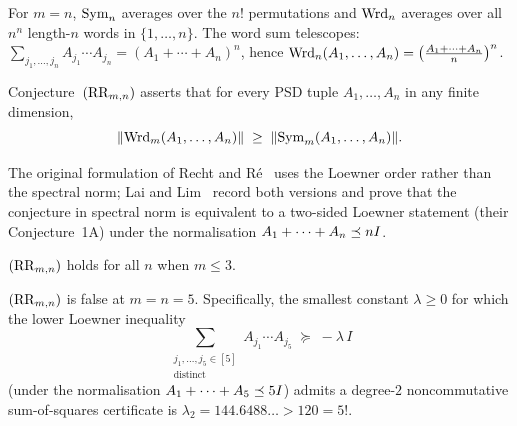\begin{remark}\label{rem:telescope}
For $m=n$, $\mathrm{Sym}_n$ averages over the $n!$ permutations and
$\mathrm{Wrd}_n$ averages over all $n^n$ length-$n$ words in
$\{1,\dots,n\}$.  The word sum telescopes:
$\sum_{j_1,\dots,j_n}A_{j_1}\cdots A_{j_n}=(A_1+\cdots+A_n)^{n}$,
hence $\mathrm{Wrd}_n(A_1,\dots,A_n)
= \bigl(\tfrac{A_1+\cdots+A_n}{n}\bigr)^{n}$.
\end{remark}

\begin{definition}
\label{def:rr}
Conjecture~$(\mathrm{RR}_{m,n})$ asserts that for every PSD tuple
$A_1,\dots,A_n$ in any finite dimension,
\[
  \lVert\mathrm{Wrd}_m(A_1,\dots,A_n)\rVert
  \;\ge\;
  \lVert\mathrm{Sym}_m(A_1,\dots,A_n)\rVert.
\]
\end{definition}

The original formulation of Recht and R\'e~\cite{RechtRe2012} uses the
Loewner order rather than the spectral norm; Lai and
Lim~\cite{LaiLim2020} record both versions and prove that the
conjecture in spectral norm is equivalent to a two-sided Loewner
statement (their Conjecture~1A) under the normalisation
$A_1+\cdots+A_n\preceq nI$.

\begin{theorem}
\label{thm:m23}
$(\mathrm{RR}_{m,n})$ holds for all $n$ when $m\le 3$.
\end{theorem}

\begin{theorem}
\label{thm:lailim}
$(\mathrm{RR}_{m,n})$ is false at $m=n=5$.  Specifically, the smallest
constant $\lambda\ge 0$ for which the lower Loewner inequality
\[
  \sum_{\substack{j_1,\dots,j_5 \in [5] \\ \text{distinct}}}
  A_{j_1}\cdots A_{j_5} \;\succeq\; -\lambda\, I
\]
(under the normalisation $A_1+\cdots+A_5\preceq 5I$) admits a
degree-$2$ noncommutative sum-of-squares certificate is
$\lambda_2 = 144.6488\ldots > 120 = 5!$.
\end{theorem}

